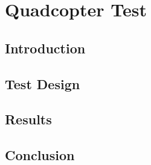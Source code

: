 \chapter{Quadcopter Test}

\section{Introduction}

\section{Test Design}

\section{Results}

\section{Conclusion}


